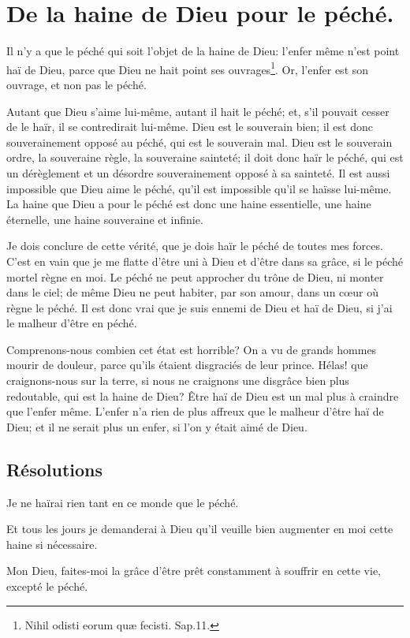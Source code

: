 \documentclass[instructions.tex]{subfiles}
\begin{document}
\chapter{De la haine de Dieu pour le péché.}


\primo Il n'y a que le péché qui soit l'objet de la haine de Dieu: l'enfer même n'est point haï de Dieu, parce que Dieu ne hait point ses ouvrages\footnote{Nihil odisti eorum quæ fecisti. Sap.11.}. Or, l'enfer est son ouvrage, et non pas le péché.

Autant que Dieu s'aime lui-même, autant il hait le péché; et, s'il pouvait cesser de le haïr, il se contredirait lui-même. Dieu est le souverain bien; il est donc souverainement opposé au péché, qui est le souverain mal. Dieu est le souverain ordre, la souveraine règle, la souveraine sainteté; il doit donc haïr le péché, qui est un dérèglement et un désordre souverainement opposé à sa sainteté. Il est aussi impossible que Dieu aime le péché, qu'il est impossible qu'il se haïsse lui-même. La haine que Dieu a pour le péché est donc une haine essentielle, une haine éternelle, une haine souveraine et infinie.

\secundo Je dois conclure de cette vérité, que je dois haïr le péché de toutes mes forces. C'est en vain que je me flatte d'être uni à Dieu et d'être dans sa grâce, si le péché mortel règne en moi. Le péché ne peut approcher du trône de Dieu, ni monter dans le ciel; de même Dieu ne peut habiter, par son amour, dans un cœur où règne le péché. Il est donc vrai que je suis ennemi de Dieu et haï de Dieu, si j'ai le malheur d'être en péché.

Comprenons-nous combien cet état est horrible? On a vu de grands hommes mourir de douleur, parce qu'ils étaient disgraciés de leur prince. Hélas! que craignons-nous sur la terre, si nous ne craignons une disgrâce bien plus redoutable, qui est la haine de Dieu? Être haï de Dieu est un mal plus à craindre que l'enfer même. L'enfer n'a rien de plus affreux que le malheur d'être haï de Dieu; et il ne serait plus un enfer, si l'on y était aimé de Dieu.


\section{Résolutions}

Je ne haïrai rien tant en ce monde que le péché.

\primo Et tous les jours je demanderai à Dieu qu'il veuille bien augmenter en moi cette haine si nécessaire.

\secundo Mon Dieu, faites-moi la grâce d'être prêt constamment à souffrir en cette vie, excepté le péché.
\end{document}

